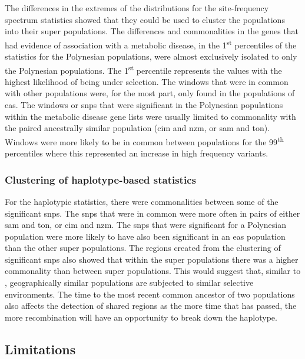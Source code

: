 \documentclass[]{report}
\begin{document}
The differences in the extremes of the distributions for the
site-frequency spectrum statistics showed that they could be used to
cluster the populations into their super populations. The differences
and commonalities in the genes that had evidence of association with a
metabolic disease, in the 1\textsuperscript{st} percentiles of the
statistics for the Polynesian populations, were almost exclusively
isolated to only the Polynesian populations. The 1\textsuperscript{st}
percentile represents the values with the highest likelihood of being
under selection. The windows that were in common with other populations
were, for the most part, only found in the populations of \gls{eas}. The
windows or \glspl{snp} that were significant in the Polynesian
populations within the metabolic disease gene lists were usually limited
to commonality with the paired ancestrally similar population (\gls{cim}
and \gls{nzm}, or \gls{sam} and \gls{ton}). Windows were more likely to
be in common between populations for the 99\textsuperscript{th}
percentiles where this represented an increase in high frequency
variants.

\subsubsection{Clustering of haplotype-based
statistics}\label{clustering-of-haplotype-based-statistics}

For the haplotypic statistics, there were commonalities between some of
the significant \glspl{snp}. The \glspl{snp} that were in common were
more often in pairs of either \gls{sam} and \gls{ton}, or \gls{cim} and
\gls{nzm}. The \glspl{snp} that were significant for a Polynesian
population were more likely to have also been significant in an
\gls{eas} population than the other super populations. The regions
created from the clustering of significant \glspl{snp} also showed that
within the super populations there was a higher commonality than between
super populations. This would suggest that, similar to \citet{Coop2009},
geographically similar populations are subjected to similar selective
environments. The time to the most recent common ancestor of two
populations also affects the detection of shared regions as the more
time that has passed, the more recombination will have an opportunity to
break down the haplotype.

\subsection{Limitations}\label{chap4limit}
\end{document}
